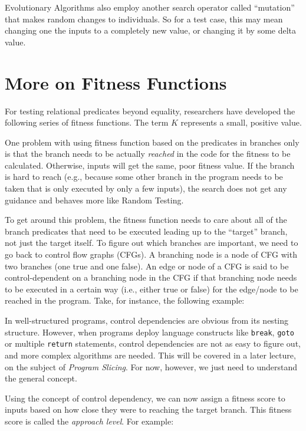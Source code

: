 
Evolutionary Algorithms also employ another search operator called ``mutation''
that makes random changes to individuals. So for a test case, this may mean
changing one the inputs to a completely new value, or changing it by some delta
value. 



\section{More on Fitness Functions}

For testing relational predicates beyond equality, researchers have developed
the following series of fitness functions. The term $K$ represents a small,
positive value.


One problem with using fitness function based on the predicates in branches
only is that the branch needs to be actually {\it reached} in the code for the fitness
to be calculated. Otherwise, inputs will get the same, poor fitness value. If
the branch is hard to reach (e.g., because some other branch in the program
needs to be taken that is only executed by only a few inputs), the search does
not get any guidance and behaves more like Random Testing.

To get around this problem, the fitness function needs to care about all of the
branch predicates that need to be executed leading up to the ``target'' branch,
not just the target itself. To figure out which branches are important, we need
to go back to control flow graphs (CFGs). A branching node is a node of CFG with
two branches (one true and one false). An edge or node of a CFG is said to be
control-dependent on a branching node in the CFG if that branching node needs to
be executed in a certain way (i.e., either true or false) for the edge/node to
be reached in the program. Take, for instance, the following example:

In well-structured programs, control dependencies are obvious from its nesting
structure. However, when programs deploy language constructs like {\tt break},
{\tt goto} or multiple {\tt return} statements, control dependencies are not as
easy to figure out, and more complex algorithms are needed. This will be
covered in a later lecture, on the subject of {\it Program Slicing}. For now,
however, we just need to understand the general concept. 

Using the concept of control dependency, we can now assign a fitness score to
inputs based on how close they were to reaching the target branch. This fitness
score is called the {\it approach level}. For example:


